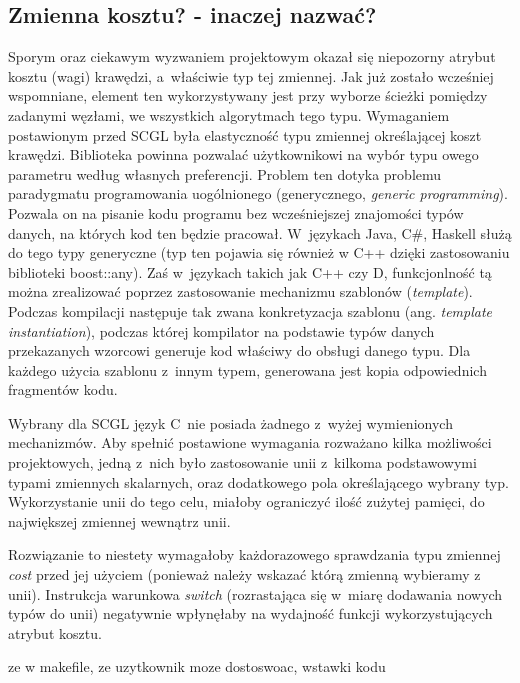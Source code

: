 \documentclass[a4paper,12pt]{thesis}
\begin{document}
\subsection{Zmienna kosztu? - inaczej nazwać?}
Sporym oraz ciekawym wyzwaniem projektowym okazał się niepozorny atrybut kosztu (wagi) krawędzi, a~właściwie typ tej zmiennej.
Jak już zostało wcześniej wspomniane, element ten wykorzystywany jest przy wyborze ścieżki pomiędzy zadanymi węzłami, we wszystkich algorytmach tego typu.
Wymaganiem postawionym przed SCGL była elastyczność typu zmiennej określającej koszt krawędzi.
Biblioteka powinna pozwalać użytkownikowi na wybór typu owego parametru według własnych preferencji.
Problem ten dotyka problemu paradygmatu programowania uogólnionego (generycznego, \emph{generic programming}).
Pozwala on na pisanie kodu programu bez wcześniejszej znajomości typów danych, na których kod ten będzie pracował.
W~językach Java, C\#, Haskell służą do tego typy generyczne (typ ten pojawia się również w C++ dzięki zastosowaniu biblioteki boost::any).
Zaś w~językach takich jak C++ czy D, funkcjonlność tą można zrealizować poprzez zastosowanie mechanizmu szablonów (\emph{template}).
Podczas kompilacji następuje tak zwana konkretyzacja szablonu (ang. \emph{template instantiation}), podczas której kompilator na podstawie typów danych przekazanych wzorcowi generuje kod właściwy do obsługi danego typu.
Dla każdego użycia szablonu z~innym typem, generowana jest kopia odpowiednich fragmentów kodu.

Wybrany dla SCGL język C~nie posiada żadnego z~wyżej wymienionych mechanizmów.
Aby spełnić postawione wymagania rozważano kilka możliwości projektowych, jedną z~nich było zastosowanie unii z~kilkoma podstawowymi typami zmiennych skalarnych, oraz dodatkowego pola określającego wybrany typ.
Wykorzystanie unii do tego celu, miałoby ograniczyć ilość zużytej pamięci, do największej zmiennej wewnątrz unii.

Rozwiązanie to niestety wymagałoby każdorazowego sprawdzania typu zmiennej \emph{cost} przed jej użyciem (ponieważ należy wskazać którą zmienną wybieramy z unii).
Instrukcja warunkowa \emph{switch} (rozrastająca się w~miarę dodawania nowych typów do unii) negatywnie wpłynęłaby na wydajność funkcji wykorzystujących atrybut kosztu.






ze w makefile, ze uzytkownik moze dostoswoac, wstawki kodu
\end{document}
